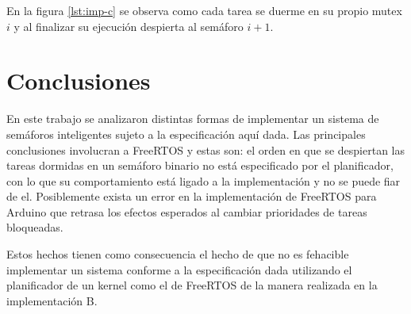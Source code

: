 	En la figura \ref{lst:imp-c} se observa como cada tarea se duerme en su propio mutex $i$ y al finalizar su ejecución despierta al semáforo $i+1$.



\section{Conclusiones}\label{sec:conclusiones}
	En este trabajo se analizaron distintas formas de implementar un sistema de semáforos inteligentes sujeto a la especificación aquí dada. Las principales conclusiones involucran a FreeRTOS y estas son: el orden en que se despiertan las tareas dormidas en un semáforo binario no está especificado por el planificador, con lo que su comportamiento está ligado a la implementación y no se puede fiar de el. Posiblemente exista un error en la implementación de FreeRTOS para Arduino que retrasa los efectos esperados al cambiar prioridades de tareas bloqueadas.

	Estos hechos tienen como consecuencia el hecho de que no es fehacible implementar un sistema conforme a la especificación dada utilizando el planificador de un kernel como el de FreeRTOS de la manera realizada en la implementación B.

